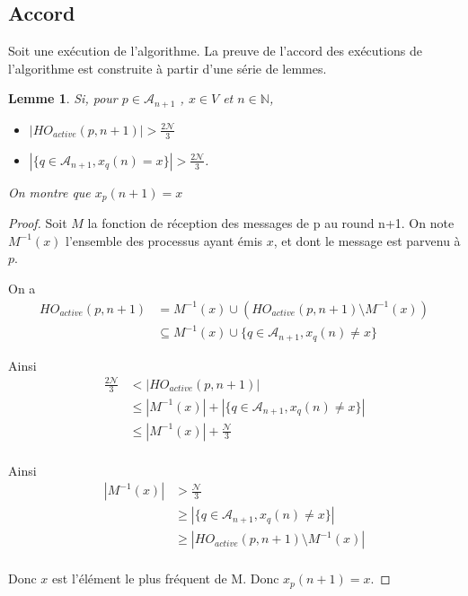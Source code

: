 \documentclass{article}
\newtheorem{lemma}{Lemme}
\begin{document}
\subsection{Accord}

Soit une exécution de l'algorithme.
La preuve de l'accord des exécutions de l'algorithme est construite à partir d'une série de lemmes.

\begin{lemma}

	Si, pour $p \in \mathcal{A}_{n+1}$ , $x \in V$ et $n \in \mathds{N}$, 

\begin{itemize}

	\item $| HO_{active} (p,n+1) | > \frac{2\mathcal{N}}{3}$
	\item $| \{ q \in \mathcal{A}_{n+1} , x_q(n) = x \} | > \frac{2\mathcal{N}}{3}$.

\end{itemize}

On montre que $x_p(n+1) = x$

\end{lemma}

\begin{proof}

	Soit $M$ la fonction de réception des messages de p au round n+1. On note $M^{-1}(x)$ l'ensemble des processus ayant émis $x$, et dont le message est parvenu à $p$.

	On a
\begin{equation}
\begin{split}
	HO_{active}(p, n+1) & = M^{-1}(x) \cup (HO_{active}(p, n+1) \setminus M^{-1}(x)) \\
	& \subseteq M^{-1}(x) \cup \{ q \in \mathcal{A}_{n+1} , x_q(n) \neq x \}
\end{split}
\end{equation}

Ainsi 
\begin{equation}
\begin{split}
\frac{2\mathcal{N}}{3} & < | HO_{active}(p, n+1) | \\
		& \leq | M^{-1}(x) | + | \{ q \in \mathcal{A}_{n+1} , x_q(n) \neq x \} | \\
		& \leq | M^{-1}(x) | +  \frac{\mathcal{N}}{3} \\
\end{split}
\end{equation}


	Ainsi
\begin{equation}
\begin{split}
| M^{-1}(x) | & > \frac{\mathcal{N}}{3} \\
		& \geq | \{ q \in \mathcal{A}_{n+1} , x_q(n) \neq x \} | \\
		& \geq | HO_{active}(p,n+1) \setminus M^{-1}(x) | \\
\end{split}
\end{equation}

Donc $x$ est l'élément le plus fréquent de M. Donc $x_p(n+1) = x$.

\end{proof}
\end{document}
